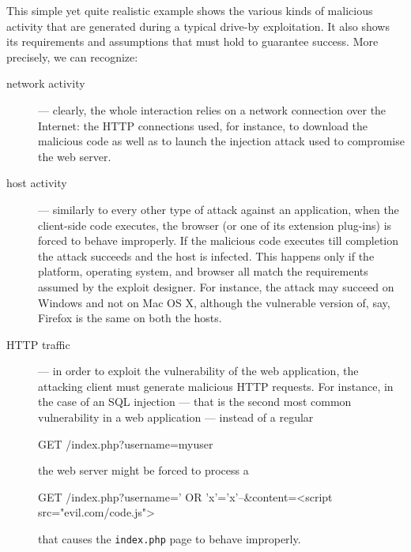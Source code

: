 \documentclass[12pt]{article}
\theoremstyle{definition}
\begin{document}
		This simple yet quite realistic example shows the various kinds of
		malicious activity that are generated during a typical drive-by
		exploitation\cite{Saeed2016}. It also shows its requirements and assumptions that must
		hold to guarantee success. More precisely, we can recognize:
		
		\begin{description}
			\item[network activity] --- clearly, the whole interaction relies on a
			network connection over the Internet: the \ac{HTTP} connections
			used, for instance, to download the malicious code as well as to
			launch the injection attack used to compromise the web server.
			\item[host activity] --- similarly to every other type of attack
			against an application, when the client-side code executes, the
			browser (or one of its extension plug-ins) is forced to behave
			improperly. If the malicious code executes till completion the
			attack succeeds and the host is infected. This happens only if the
			platform, operating system, and browser all match the requirements
			assumed by the exploit designer. For instance, the attack may
			succeed on \textsf{Windows} and not on \textsf{Mac OS X}, although
			the vulnerable version of, say, \textsf{Firefox} is the same on both
			the hosts.
			\item[HTTP traffic] --- in order to exploit the vulnerability of the
			web application, the attacking client must generate malicious
			HTTP requests. For instance, in the case of an SQL
			injection --- that is the second most common vulnerability in a web
			application --- instead of a regular
			
			\begin{logs}
GET /index.php?username=myuser 
			\end{logs}
			
			\noindent the web server might be forced to process a
			
			\begin{logs}
GET /index.php?username=' OR 'x'='x'--\&content=<script
src="evil.com/code.js">
			\end{logs}
			
			\noindent that causes the \texttt{index.php} page to behave
			improperly.
		\end{description}
		
\end{document}
